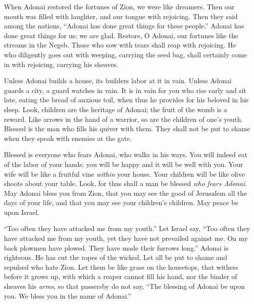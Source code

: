 \begin{biblechapter} %
 When Adonai restored the fortunes of Zion, 
we were like dreamers.
\verse Then our mouth was filled with laughter, 
and our tongue with rejoicing. 
Then they said among the nations, 
“Adonai has done great things for these people.”
\verse Adonai has done great things for us; 
we are glad.
\verse Restore, O Adonai, our fortunes 
like the streams in the Negeb.
\verse Those who sow with tears 
shall reap with rejoicing.
\verse He who diligently goes out with weeping, 
carrying the seed bag, 
shall certainly come in with rejoicing, 
carrying his sheaves.
\end{biblechapter}

\begin{biblechapter} %
 Unless Adonai builds a house, 
its builders labor at it in vain. 
Unless Adonai guards a city, 
a guard watches in vain.
\verse It is in vain for you who rise early and sit late, 
eating the bread of anxious toil, 
when thus he provides for his beloved in his sleep.
\verse Look, children are the heritage of Adonai; 
the fruit of the womb is a reward.
\verse Like arrows in the hand of a warrior, 
so are the children of one’s youth.
\verse Blessed is the man who fills his quiver with them. 
They shall not be put to shame 
when they speak with enemies at the gate.
\end{biblechapter}

\begin{biblechapter} %
 Blessed is everyone who fears Adonai, 
who walks in his ways.
\verse You will indeed eat of the labor of your hands; 
you will be happy and it will be well with you.
\verse Your wife will be like a fruitful vine 
\textit{within} your house. 
Your children will be like olive shoots 
about your table.
\verse Look, for thus shall a man be blessed 
\textit{who fears Adonai}.
\verse May Adonai bless you from Zion, 
that you may see the good of Jerusalem 
all the days of your life,
\verse and that you may see your children’s children. 
May peace be upon Israel.
\end{biblechapter}

\begin{biblechapter} %
 “Too often they have attacked me from my youth.” 
Let Israel say,
\verse “Too often they have attacked me from my youth, 
yet they have not prevailed against me.
\verse On my back plowmen have plowed. 
They have made their furrows long.”
\verse Adonai is righteous. 
He has cut the ropes of the wicked.
\verse Let all be put to shame and repulsed 
who hate Zion.
\verse Let them be like grass on the housetops, 
that withers before it grows up,
\verse with which a reaper cannot fill his hand, 
nor the binder of sheaves his \textit{arms},
\verse so that passersby do not say, 
“The blessing of Adonai be upon you. 
We bless you in the name of Adonai.”
\end{biblechapter}

